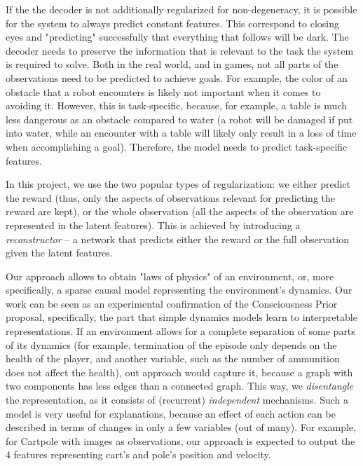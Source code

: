 \documentclass[a4paper,11pt,oneside]{report}
\begin{document}
If the the decoder is not additionally regularized for non-degeneracy, it is possible for the system to always predict constant features. This correspond to closing eyes and "predicting" successfully that everything that follows will be dark. The decoder needs to preserve the information that is relevant to the task the system is required to solve. Both in the real world, and in games, not all parts of the observations need to be predicted to achieve goals. For example, the color of an obstacle that a robot encounters is likely not important when it comes to avoiding it. However, this is task-specific, because, for example, a table is much less dangerous as an obstacle compared to water (a robot will be damaged if put into water, while an encounter with a table will likely only result in a loss of time when accomplishing a goal). Therefore, the model needs to predict task-specific features.

In this project, we use the two popular types of regularization: we either predict the reward (thus, only the aspects of observations relevant for predicting the reward are kept), or the whole observation (all the aspects of the observation are represented in the latent features). This is achieved by introducing a {\em reconstructor} -- a network that predicts either the reward or the full observation given the latent features.

Our approach allows to obtain "laws of physics" of an environment, or, more specifically, a sparse causal model representing the environment's dynamics.
Our work can be seen as an experimental confirmation of the Consciousness Prior proposal\cite{Bengio2017}, specifically, the part that simple dynamics models learn to interpretable representations.
If an environment allows for a complete separation of some parts of its dynamics (for example, termination of the episode only depends on the health of the player, and another variable, such as the number of ammunition does not affect the health), out approach would capture it, because a graph with two components has less edges than a connected graph. This way, we {\em disentangle} the representation, as it consists of (recurrent) {\em independent} mechanisms.
Such a model is very useful for explanations, because an effect of each action can be described in terms of changes in only a few variables (out of many). For example, for Cartpole with images as observations, our approach is expected to output the 4 features representing cart's and pole's position and velocity.
\end{document}
